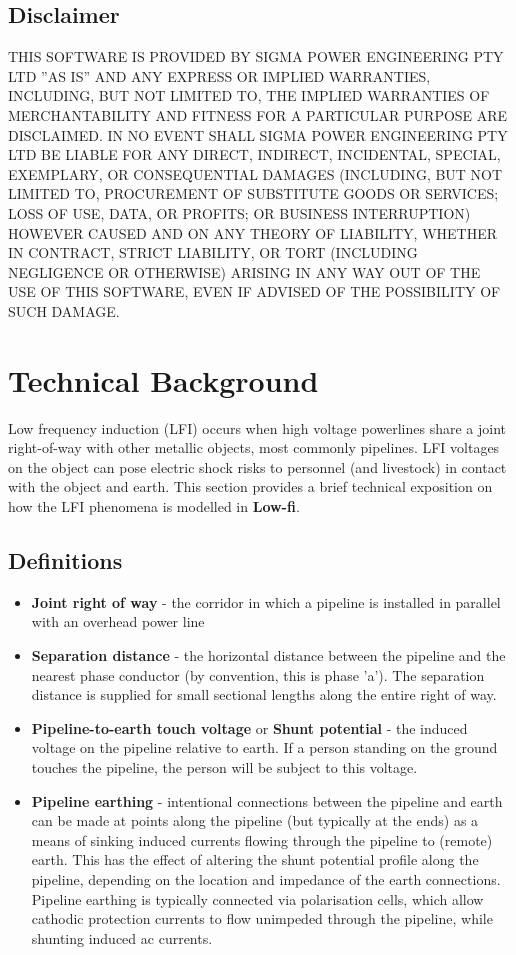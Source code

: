 \documentclass{article}
\begin{document}
\subsection{Disclaimer}

THIS SOFTWARE IS PROVIDED BY SIGMA POWER ENGINEERING PTY LTD ''AS IS'' AND ANY
EXPRESS OR IMPLIED WARRANTIES, INCLUDING, BUT NOT LIMITED TO, THE IMPLIED
WARRANTIES OF MERCHANTABILITY AND FITNESS FOR A PARTICULAR PURPOSE ARE
DISCLAIMED. IN NO EVENT SHALL SIGMA POWER ENGINEERING PTY LTD BE LIABLE FOR ANY
DIRECT, INDIRECT, INCIDENTAL, SPECIAL, EXEMPLARY, OR CONSEQUENTIAL DAMAGES
(INCLUDING, BUT NOT LIMITED TO, PROCUREMENT OF SUBSTITUTE GOODS OR SERVICES;
LOSS OF USE, DATA, OR PROFITS; OR BUSINESS INTERRUPTION) HOWEVER CAUSED AND
ON ANY THEORY OF LIABILITY, WHETHER IN CONTRACT, STRICT LIABILITY, OR TORT
(INCLUDING NEGLIGENCE OR OTHERWISE) ARISING IN ANY WAY OUT OF THE USE OF THIS
SOFTWARE, EVEN IF ADVISED OF THE POSSIBILITY OF SUCH DAMAGE.

\newpage
\section{Technical Background}

Low frequency induction (LFI) occurs when high voltage powerlines share a joint right-of-way with other metallic objects, most commonly pipelines. LFI voltages on the object can pose electric shock risks to personnel (and livestock) in contact with the object and earth. This section provides a brief technical exposition on how the LFI phenomena is modelled in \textbf{Low-fi}. 

\subsection{Definitions}

\begin{itemize}
\item \textbf{Joint right of way} - the corridor in which a pipeline is installed in parallel with an overhead power line
\item \textbf{Separation distance} - the horizontal distance between the pipeline and the nearest phase conductor (by convention, this is phase 'a'). The separation distance is supplied for small sectional lengths along the entire right of way.
\item \textbf{Pipeline-to-earth touch voltage} or \textbf{Shunt potential} - the induced voltage on the pipeline relative to earth. If a person standing on the ground touches the pipeline, the person will be subject to this voltage. 
\item \textbf{Pipeline earthing} - intentional connections between the pipeline and earth can be made at points along the pipeline (but typically at the ends) as a means of sinking induced currents flowing through the pipeline to (remote) earth. This has the effect of altering the shunt potential profile along the pipeline, depending on the location and impedance of the earth connections. Pipeline earthing is typically connected via polarisation cells, which allow cathodic protection currents to flow unimpeded through the pipeline, while shunting induced ac currents.
\end{itemize}
\end{document}

